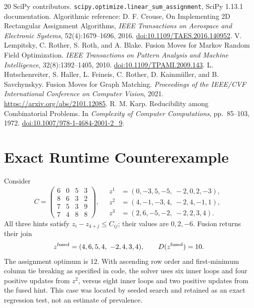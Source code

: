 \documentclass[10pt,letterpaper]{article}
\begin{document}
\begin{thebibliography}{20}
 SciPy contributors. \texttt{scipy.optimize.linear\_sum\_assignment}, SciPy 1.13.1 documentation. Algorithmic reference: D. F. Crouse, On Implementing 2D Rectangular Assignment Algorithms, \emph{IEEE Transactions on Aerospace and Electronic Systems}, 52(4):1679--1696, 2016. \href{https://doi.org/10.1109/TAES.2016.140952}{doi:10.1109/TAES.2016.140952}.
 V. Lempitsky, C. Rother, S. Roth, and A. Blake. Fusion Moves for Markov Random Field Optimization. \emph{IEEE Transactions on Pattern Analysis and Machine Intelligence}, 32(8):1392--1405, 2010. \href{https://doi.org/10.1109/TPAMI.2009.143}{doi:10.1109/TPAMI.2009.143}.
 L. Hutschenreiter, S. Haller, L. Feineis, C. Rother, D. Kainm{\"u}ller, and B. Savchynskyy. Fusion Moves for Graph Matching. \emph{Proceedings of the IEEE/CVF International Conference on Computer Vision}, 2021. \url{https://arxiv.org/abs/2101.12085}.
 R. M. Karp. Reducibility among Combinatorial Problems. In \emph{Complexity of Computer Computations}, pp.\ 85--103, 1972. \href{https://doi.org/10.1007/978-1-4684-2001-2_9}{doi:10.1007/978-1-4684-2001-2\_9}.
\end{thebibliography}

\clearpage\appendix
\section{Exact Runtime Counterexample}\label{app:counterexample}
Consider
\[
 C=\begin{pmatrix}6&0&5&3\\8&6&3&2\\7&5&3&9\\7&4&8&8\end{pmatrix},\quad
 \begin{aligned}
 z^1&=(0,-3,5,-5,\ -2,0,2,-3),\\
 z^2&=(4,-1,-3,4,\ -2,4,-1,1),\\
 z^3&=(2,6,-5,-2,\ -2,2,3,4).
 \end{aligned}
\]
All three hints satisfy $z_i-z_{4+j}\leq C_{ij}$; their values are $0,2,-6$. Fusion returns their join
\[
 z^{\rm fused}=(4,6,5,4,\ -2,4,3,4),\qquad D(z^{\rm fused})=10.
\]
The assignment optimum is 12. With ascending row order and first-minimum column tie breaking as specified in code, the solver uses six inner loops and four positive updates from $z^2$, versus eight inner loops and two positive updates from the fused hint. This case was located by seeded search and retained as an exact regression test, not an estimate of prevalence.
\end{document}
